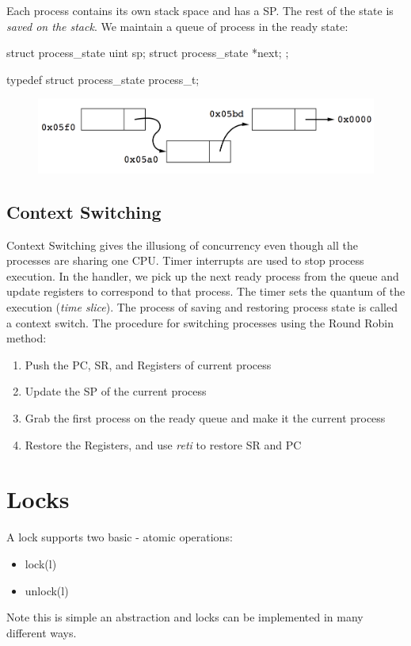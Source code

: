 \documentclass{hw}
\begin{document}
Each process contains its own stack space and has a SP. The rest of the state is
\emph{saved on the stack}. We maintain a queue of process in the ready state:
\begin{C}
struct process_state {
  uint sp;
  struct process_state *next;
};

typedef struct process_state process_t;
\end{C}

\begin{figure}[H]
  \centering
  \includegraphics[scale=.4]{queue}
\end{figure}

\subsection{Context Switching}
Context Switching gives the illusiong of concurrency even though
all the processes are sharing one CPU.
Timer interrupts are used to stop process execution. In the handler, we pick up
the next ready process from the queue and update registers to correspond to that
process. The timer sets the quantum of the execution (\emph{time slice}). The
process of saving and restoring process state is called a context switch.
The procedure for switching processes using the Round Robin method:

\begin{enumerate}
  \item Push the PC, SR, and Registers of current process
  \item Update the SP of the current process 
  \item Grab the first process on the ready queue and make it the current process
  \item Restore the Registers, and use \emph{reti} to restore SR and PC
\end{enumerate}


\section{Locks}
A lock supports two basic - atomic operations:
\begin{itemize}
  \item lock(l)
  \item unlock(l)
\end{itemize}
Note this is simple an abstraction and locks can be implemented in many 
different ways.
\end{document}
